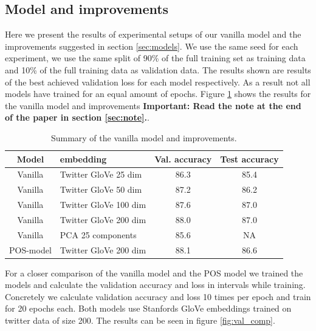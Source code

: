 \documentclass[conference]{IEEEtran}
\newcommand{\Glove}{GloVe }
\begin{document}
	\subsection{Model and improvements}
	Here we present the results of experimental setups of our vanilla model and the improvements suggested in section \ref{sec:models}. We use the same seed for each experiment, we use the same split of 90\% of the full training set as training data and 10\% of the full training data as validation data. The results shown are results of the best achieved validation loss for each model respectively. As a result not all models have trained for an equal amount of epochs. Figure \ref{tab:models} shows the results for the vanilla model and improvements \textbf{Important: Read the note at the end of the paper in section \ref{sec:note}.}.
	\begin{table}[h!]
        \caption{Summary of the vanilla model and improvements.}
        \label{tab:models}
		\begin{tabular}{|c|l|c|c|}
			\hline
			Model & embedding & Val. accuracy & Test accuracy\\
			\hline
			Vanilla & Twitter \Glove 25 dim & 86.3 & 85.4\\
			Vanilla & Twitter \Glove 50 dim & 87.2 & 86.2\\
			Vanilla & Twitter \Glove 100 dim & 87.6 & 87.0\\
			Vanilla & Twitter \Glove 200 dim & 88.0 & 87.0\\
			Vanilla & PCA 25 components & 85.6 & NA \\
            POS-model & Twitter \Glove 200 dim & 88.1 & 86.6 \\
			\hline
		\end{tabular} 
	\end{table}
For a closer comparison of the vanilla model and the POS model we trained the models and calculate the validation accuracy and loss in intervals while training. Concretely we calculate validation accuracy and loss 10 times per epoch and train for 20 epochs each. Both models use Stanfords \Glove embeddings trained on twitter data of size 200. The results can be seen in figure \ref{fig:val_comp}.
\end{document}
